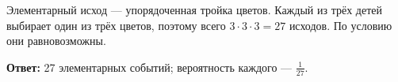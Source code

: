 \begin{solution}\label{solution-random-events-homework-4}
Элементарный исход — упорядоченная тройка цветов. Каждый из трёх детей выбирает один из трёх цветов, поэтому всего $3\cdot3\cdot3=27$ исходов. По условию они равновозможны.

\textbf{Ответ:} 27 элементарных событий; вероятность каждого — $\frac1{27}$.
\end{solution}

